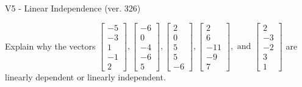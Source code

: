 \begin{exercise}
  \begin{exerciseTitle}V5 - Linear Independence (ver. 326)\end{exerciseTitle}
  \begin{exerciseStatement}
    Explain why the vectors \(\left[\begin{array}{r}
-5 \\
-3 \\
1 \\
-1 \\
2
\end{array}\right] , \left[\begin{array}{r}
-6 \\
0 \\
-4 \\
-6 \\
5
\end{array}\right] , \left[\begin{array}{r}
2 \\
0 \\
5 \\
5 \\
-6
\end{array}\right] , \left[\begin{array}{r}
2 \\
6 \\
-11 \\
-9 \\
7
\end{array}\right] , \text{ and } \left[\begin{array}{r}
2 \\
-3 \\
-2 \\
3 \\
1
\end{array}\right]\) are linearly dependent or linearly independent.	



\end{exerciseStatement}
\end{exercise}
